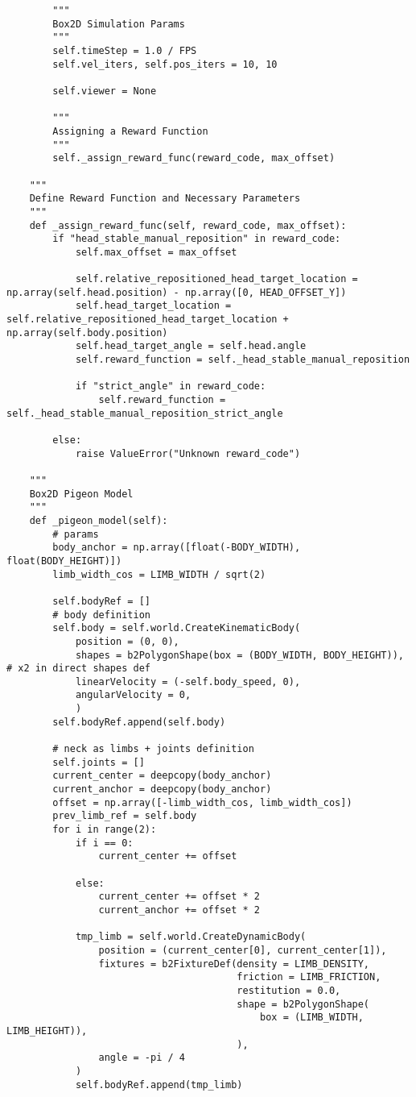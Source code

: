 \begin{lstlisting}
        """
        Box2D Simulation Params
        """
        self.timeStep = 1.0 / FPS
        self.vel_iters, self.pos_iters = 10, 10

        self.viewer = None

        """
        Assigning a Reward Function
        """
        self._assign_reward_func(reward_code, max_offset)

    """
    Define Reward Function and Necessary Parameters
    """
    def _assign_reward_func(self, reward_code, max_offset):
        if "head_stable_manual_reposition" in reward_code:
            self.max_offset = max_offset

            self.relative_repositioned_head_target_location = np.array(self.head.position) - np.array([0, HEAD_OFFSET_Y])
            self.head_target_location = self.relative_repositioned_head_target_location + np.array(self.body.position)
            self.head_target_angle = self.head.angle
            self.reward_function = self._head_stable_manual_reposition

            if "strict_angle" in reward_code:
                self.reward_function = self._head_stable_manual_reposition_strict_angle

        else:
            raise ValueError("Unknown reward_code")

    """
    Box2D Pigeon Model
    """
    def _pigeon_model(self):
        # params
        body_anchor = np.array([float(-BODY_WIDTH), float(BODY_HEIGHT)])
        limb_width_cos = LIMB_WIDTH / sqrt(2)

        self.bodyRef = []
        # body definition
        self.body = self.world.CreateKinematicBody(
            position = (0, 0),
            shapes = b2PolygonShape(box = (BODY_WIDTH, BODY_HEIGHT)), # x2 in direct shapes def
            linearVelocity = (-self.body_speed, 0),
            angularVelocity = 0,
            )
        self.bodyRef.append(self.body)

        # neck as limbs + joints definition
        self.joints = []
        current_center = deepcopy(body_anchor)
        current_anchor = deepcopy(body_anchor)
        offset = np.array([-limb_width_cos, limb_width_cos])
        prev_limb_ref = self.body
        for i in range(2):
            if i == 0:
                current_center += offset

            else:
                current_center += offset * 2
                current_anchor += offset * 2

            tmp_limb = self.world.CreateDynamicBody(
                position = (current_center[0], current_center[1]),
                fixtures = b2FixtureDef(density = LIMB_DENSITY,
                                        friction = LIMB_FRICTION,
                                        restitution = 0.0,
                                        shape = b2PolygonShape(
                                            box = (LIMB_WIDTH, LIMB_HEIGHT)),
                                        ),
                angle = -pi / 4
            )
            self.bodyRef.append(tmp_limb)


\end{lstlisting}
